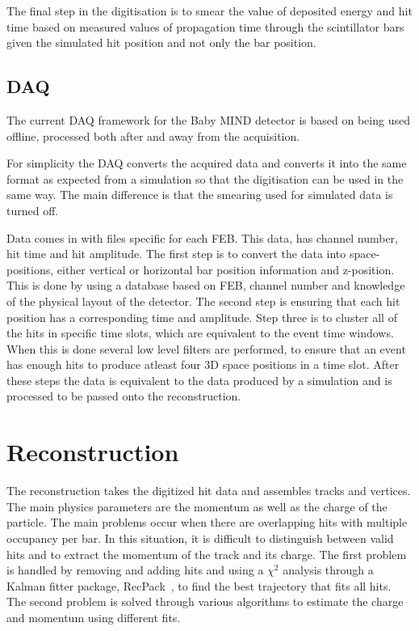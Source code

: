 The final step in the digitisation is to smear the value of deposited energy and hit time based on measured values of propagation time through the scintillator bars given the simulated hit position and not only the bar position.

\subsection{DAQ}

The current DAQ framework for the Baby MIND detector is based on being used offline, processed both after and away from the acquisition.

For simplicity the DAQ converts the acquired data and converts it into the same format as expected from a simulation so that the digitisation can be used in the same way. The main difference is that the smearing used for simulated data is turned off. 

Data comes in with files specific for each FEB. This data, has channel number, hit time and hit amplitude. The first step is to convert the data into space-positions, either vertical or horizontal bar position information and z-position. This is done by using a database based on FEB, channel number and knowledge of the physical layout of the detector. The second step is ensuring that each hit position has a corresponding time and amplitude. Step three is to cluster all of the hits in specific time slots, which are equivalent to the event time windows. When this is done several low level filters are performed, to ensure that an event has enough hits to produce atleast four 3D space positions in a time slot. After these steps the data is equivalent to the data produced by a simulation and is processed to be passed onto the reconstruction.

\pagebreak
\section{Reconstruction}\label{sec:reconstruction}
The reconstruction takes the digitized hit data and assembles tracks and vertices. The main physics parameters are the momentum as well as the charge of the particle. The main problems occur when there are overlapping hits with multiple occupancy per bar. In this situation, it is difficult to distinguish between valid hits and to extract the momentum of the track and its charge.
The first problem is handled by removing and adding hits and using a $\chi^2$ analysis through a Kalman fitter package, RecPack~\cite{RecPack}, to find the best trajectory that fits all hits. The second problem is solved through various algorithms to estimate the charge and momentum using different fits.

